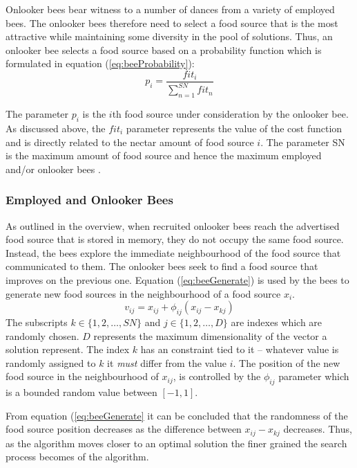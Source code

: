 Onlooker bees bear witness to a number of dances from a variety of employed bees. The onlooker bees therefore need to select a food source that is the most attractive while maintaining some diversity in the pool of solutions. Thus, an onlooker bee selects a food source based on a probability function which is formulated in equation (\ref{eq:beeProbability})\cite{ABCCompareStudy}:
\begin{equation}
\label{eq:beeProbability}
p_i = \frac{{fit}_i}{\sum^{SN}_{n=1}{fit}_n}
\end{equation}

The parameter $p_i$ is the $i$th food source under consideration by the onlooker bee. As discussed above, the ${fit}_i$ parameter represents the value of the cost function and is directly related to the nectar amount of food source $i$. The parameter SN is the maximum amount of food source and hence the maximum employed and/or onlooker bees \cite{ABCCompareStudy}.

\subsubsection{Employed and Onlooker Bees}
As outlined in the overview, when recruited onlooker bees reach the advertised food source that is stored in memory, they do not occupy the same food source. Instead, the bees explore the immediate neighbourhood of the food source that communicated to them. The onlooker bees seek to find a food source that improves on the previous one. Equation (\ref{eq:beeGenerate}) is used by the bees to generate new food sources in the neighbourhood of a food source $x_i$.
\begin{equation}
\label{eq:beeGenerate}
v_{ij} = x_{ij} + \phi_{ij}(x_{ij} - x_{kj})
\end{equation}
The subscripts $k \in \{1,2,\dots,SN\}$ and $j \in \{1,2,\dots,D\}$ are indexes which are randomly chosen. $D$ represents the maximum dimensionality of the vector a solution represent. The index $k$ has an constraint tied to it -- whatever value is randomly assigned to $k$ it \emph{must} differ from the value $i$. The position of the new food source in the neighbourhood of $x_{ij}$, is controlled by the $\phi_{ij}$ parameter which is a bounded random value between $[-1,1]$. 

From equation (\ref{eq:beeGenerate} it can be concluded that the randomness of the food source position decreases as the difference between $x_{ij} - x_{kj}$ decreases. Thus, as the algorithm moves closer to an optimal solution the finer grained the search process becomes of the algorithm.

